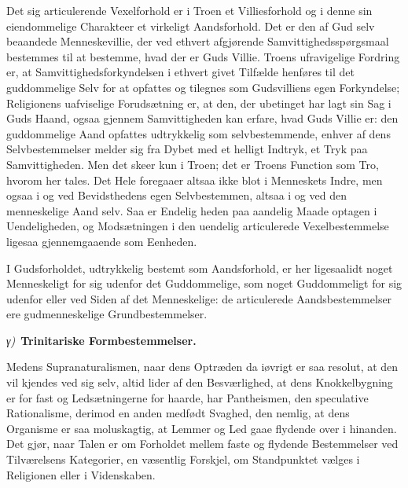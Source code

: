 \documentclass[12pt]{book}
\newcommand{\greekrun}[2]{%
  \medskip\begin{center}{\itshape #1)}\ {\bfseries #2}\end{center}\medskip}
\begin{document}
Det sig articulerende Vexelforhold er i Troen et Villiesforhold og i
denne sin eiendommelige Charakteer et virkeligt Aandsforhold. Det er
den af Gud selv beaandede Menneskevillie, der ved ethvert
afgjørende Samvittighedsspørgsmaal bestemmes til at bestemme, hvad
der er Guds Villie. Troens ufravigelige Fordring er, at
Samvittighedsforkyndelsen i ethvert givet Tilfælde henføres til det
guddommelige Selv for at opfattes og tilegnes som Gudsvilliens egen
Forkyndelse; Religionens uafviselige Forudsætning er, at den, der
ubetinget har lagt sin Sag i Guds Haand, ogsaa gjennem
Samvittigheden kan erfare, hvad Guds Villie er: den guddommelige
Aand opfattes udtrykkelig som selvbestemmende, enhver af dens
Selvbestemmelser melder sig fra Dybet med et helligt Indtryk, et
Tryk paa Samvittigheden. Men det skeer kun i Troen; det er Troens
Function som Tro, hvorom her tales. Det Hele foregaaer altsaa ikke
blot i Menneskets Indre, men ogsaa i og ved Bevidsthedens egen
Selvbestemmen, altsaa i og ved den menneskelige Aand selv. Saa er
Endelig\-
heden paa aandelig Maade optagen i Uendeligheden, og Modsætningen i
den uendelig articulerede Vexelbestemmelse ligesaa gjennemgaaende
som Eenheden.

I Gudsforholdet, udtrykkelig bestemt som Aandsforhold, er her
ligesaalidt noget Menneskeligt for sig udenfor det Guddommelige, som
noget Guddommeligt for sig udenfor eller ved Siden af det
Menneskelige: de articulerede Aandsbestemmelser ere gudmenneskelige
Grundbestemmelser.

\greekrun{γ}{Trinitariske Formbestemmelser.}

Medens Supranaturalismen, naar dens Optræden da iøvrigt er saa
resolut, at den vil kjendes ved sig selv, altid lider af den
Besværlighed, at dens Knokkelbygning er for fast og Ledsætningerne
for haarde, har Pantheismen, den speculative Rationalisme, derimod
en anden medfødt Svaghed, den nemlig, at dens Organisme er saa
moluskagtig, at Lemmer og Led gaae flydende over i hinanden. Det
gjør, naar Talen er om Forholdet mellem faste og flydende
Bestemmelser ved Tilværelsens Kategorier, en væsentlig Forskjel, om
Standpunktet vælges i Religionen eller i Videnskaben.
\end{document}
